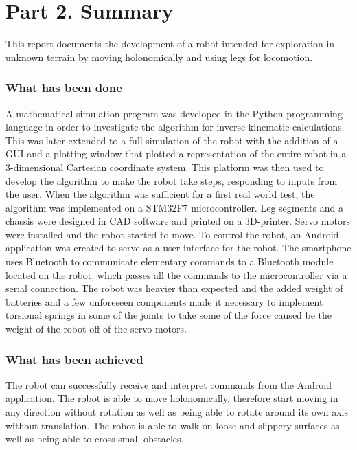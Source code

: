 \section*{Part 2. Summary}
\newpage
This report documents the development of a robot intended for exploration in unknown terrain by moving holonomically and using legs for locomotion.\\

\subsubsection*{What has been done}
A mathematical simulation program was developed in the Python programming language in order to investigate the algorithm for inverse kinematic calculations. This was later extended to a full simulation of the robot with the addition of a GUI and a plotting window that plotted a representation of the entire robot in a 3-dimensional Cartesian coordinate system. This platform was then used to develop the algorithm to make the robot take steps, responding to inputs from the user. When the algorithm was sufficient for a first real world test, the algorithm was implemented on a STM32F7 microcontroller. Leg segments and a chassis were designed in CAD software and printed on a 3D-printer. Servo motors were installed and the robot started to move. To control the robot, an Android application was created to serve as a user interface for the robot. The smartphone uses Bluetooth to communicate elementary commands to a Bluetooth module located on the robot, which passes all the commands to the microcontroller via a serial connection. The robot was heavier than expected and the added weight of batteries and a few unforeseen components made it necessary to implement torsional springs in some of the joints to take some of the force caused be the weight of the robot off of the servo motors.\\

\subsubsection*{What has been achieved}
The robot can successfully receive and interpret commands from the Android application. The robot is able to move holonomically, therefore start moving in any direction without rotation as well as being able to rotate around its own axis without translation. The robot is able to walk on loose and slippery surfaces as well as being able to cross small obstacles.\\

